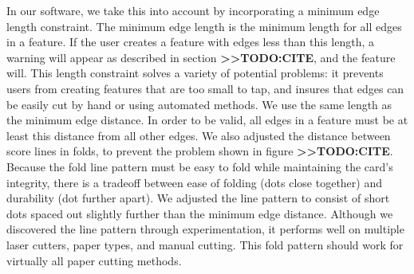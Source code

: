 In our software, we take this into account by incorporating a minimum
edge length constraint. The minimum edge length is the minimum length
for all edges in a feature. If the user creates a feature with edges
less than this length, a warning will appear as described in section
\textbf{\textgreater{}\textgreater{}TODO:CITE}, and the feature will.
This length constraint solves a variety of potential problems: it
prevents users from creating features that are too small to tap, and
insures that edges can be easily cut by hand or using automated methods.
We use the same length as the minimum edge distance. In order to be
valid, all edges in a feature must be at least this distance from all
other edges. We also adjusted the distance between score lines in folds,
to prevent the problem shown in figure
\textbf{\textgreater{}\textgreater{}TODO:CITE}. Because the fold line
pattern must be easy to fold while maintaining the card's integrity,
there is a tradeoff between ease of folding (dots close together) and
durability (dot further apart). We adjusted the line pattern to consist
of short dots spaced out slightly further than the minimum edge
distance. Although we discovered the line pattern through
experimentation, it performs well on multiple laser cutters, paper
types, and manual cutting. This fold pattern should work for virtually
all paper cutting methods.
